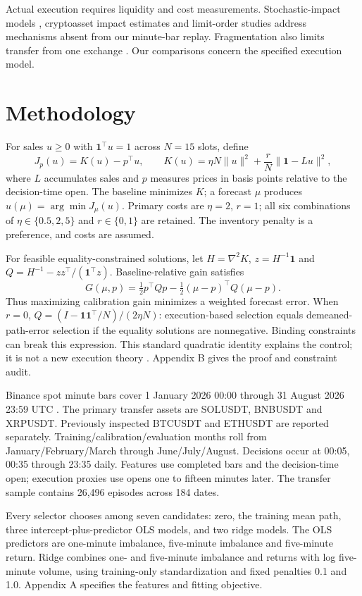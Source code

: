 \documentclass[11pt]{article}
\begin{document}
Actual execution requires liquidity and cost measurements. Stochastic-impact models \citep{fouque2022}, cryptoasset impact estimates \citep{barucci2023} and limit-order studies \citep{schnaubelt2022} address mechanisms absent from our minute-bar replay. Fragmentation also limits transfer from one exchange \citep{makarov2020,almeida2024}. Our comparisons concern the specified execution model.

\section{Methodology}
For sales $u\geq0$ with $\mathbf1^\top u=1$ across $N=15$ slots, define
\[
J_p(u)=K(u)-p^\top u,\qquad
K(u)=\eta N\|u\|^2+\frac rN\|\mathbf1-Lu\|^2,
\]
where $L$ accumulates sales and $p$ measures prices in basis points relative to the decision-time open. The baseline minimizes $K$; a forecast $\mu$ produces $u(\mu)=\arg\min J_\mu(u)$. Primary costs are $\eta=2$, $r=1$; all six combinations of $\eta\in\{0.5,2,5\}$ and $r\in\{0,1\}$ are retained. The inventory penalty is a preference, and costs are assumed.

For feasible equality-constrained solutions, let $H=\nabla^2K$, $z=H^{-1}\mathbf1$ and $Q=H^{-1}-zz^\top/(\mathbf1^\top z)$. Baseline-relative gain satisfies
\[
G(\mu,p)=\tfrac12p^\top Qp-\tfrac12(\mu-p)^\top Q(\mu-p).
\]
Thus maximizing calibration gain minimizes a weighted forecast error. When $r=0$, $Q=(I-\mathbf1\mathbf1^\top/N)/(2\eta N)$: execution-based selection equals demeaned-path-error selection if the equality solutions are nonnegative. Binding constraints can break this expression. This standard quadratic identity explains the control; it is not a new execution theory \citep{forde2022,abijaber2025}. Appendix B gives the proof and constraint audit.

Binance spot minute bars cover 1 January 2026 00:00 through 31 August 2026 23:59 UTC \citep{binance2026}. The primary transfer assets are SOLUSDT, BNBUSDT and XRPUSDT. Previously inspected BTCUSDT and ETHUSDT are reported separately. Training/calibration/evaluation months roll from January/February/March through June/July/August. Decisions occur at 00:05, 00:35 through 23:35 daily. Features use completed bars and the decision-time open; execution proxies use opens one to fifteen minutes later. The transfer sample contains 26,496 episodes across 184 dates.

Every selector chooses among seven candidates: zero, the training mean path, three intercept-plus-predictor OLS models, and two ridge models. The OLS predictors are one-minute imbalance, five-minute imbalance and five-minute return. Ridge combines one- and five-minute imbalance and returns with log five-minute volume, using training-only standardization and fixed penalties 0.1 and 1.0. Appendix A specifies the features and fitting objective.
\end{document}
